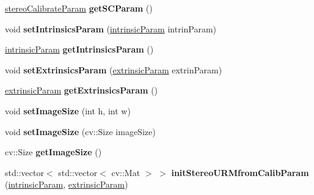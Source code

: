 \begin{DoxyCompactItemize}
\mbox{\hyperlink{structstereo_calibrate_param}{stereo\+Calibrate\+Param}} {\bfseries get\+S\+C\+Param} ()
\item 
\mbox{\label{classstereoprocessing_acc0013473597b6371d9df4f214748341}} 
void {\bfseries set\+Intrinsics\+Param} (\mbox{\hyperlink{structintrinsic_param}{intrinsic\+Param}} intrin\+Param)
\item 
\mbox{\label{classstereoprocessing_a6ded43880106e321886d216eb4101b17}} 
\mbox{\hyperlink{structintrinsic_param}{intrinsic\+Param}} {\bfseries get\+Intrinsics\+Param} ()
\item 
\mbox{\label{classstereoprocessing_af8875d3aa72f0e35192605f616a9d25d}} 
void {\bfseries set\+Extrinsics\+Param} (\mbox{\hyperlink{structextrinsic_param}{extrinsic\+Param}} extrin\+Param)
\item 
\mbox{\label{classstereoprocessing_ab004a794a78bd53248b03592a3d639c6}} 
\mbox{\hyperlink{structextrinsic_param}{extrinsic\+Param}} {\bfseries get\+Extrinsics\+Param} ()
\item 
\mbox{\label{classstereoprocessing_ab958aaa8f6659c9b95e836d4797ff5b0}} 
void {\bfseries set\+Image\+Size} (int h, int w)
\item 
\mbox{\label{classstereoprocessing_a9e94881d8ba35e261bef6a55c92aac91}} 
void {\bfseries set\+Image\+Size} (cv\+::\+Size image\+Size)
\item 
\mbox{\label{classstereoprocessing_a326694848de465a3a82e99e195505e31}} 
cv\+::\+Size {\bfseries get\+Image\+Size} ()
\item 
\mbox{\label{classstereoprocessing_a98bebd22cbe12067f57cf8710a6c5da6}} 
std\+::vector$<$ std\+::vector$<$ cv\+::\+Mat $>$ $>$ {\bfseries init\+Stereo\+U\+R\+Mfrom\+Calib\+Param} (\mbox{\hyperlink{structintrinsic_param}{intrinsic\+Param}}, \mbox{\hyperlink{structextrinsic_param}{extrinsic\+Param}})
\item 
\mbox{\label{classstereoprocessing_a00688f7a01f09ea90b09919211f27a58}} 

\end{DoxyCompactItemize}

